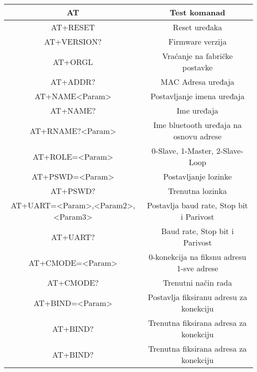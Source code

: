 \documentclass[../Document.tex]{subfiles}
\begin{document}
\begin{table}[h]
    \def\arraystretch{1.5}
    \centering
    \begin{tabular}{ |c|c| }
        \hline
        AT                                & Test komanad                              \\\hline
        AT+RESET                          & Reset uređaka                             \\\hline
        AT+VERSION?                       & Firmware verzija                          \\\hline
        AT+ORGL                           & Vraćanje na fabričke postavke             \\\hline
        AT+ADDR?                          & MAC Adresa uređaja                        \\\hline
        AT+NAME<Param>                    & Postavljanje imena uređaja                \\\hline
        AT+NAME?                          & Ime uređaja                               \\\hline
        AT+RNAME?<Param>                  & Ime bluetooth uređaja na osnovu adrese    \\\hline
        AT+ROLE=<Param>                   & 0-Slave, 1-Master, 2-Slave-Loop           \\\hline
        AT+PSWD=<Param>                   & Postavljanje lozinke                         \\\hline
        AT+PSWD?                   & Trenutna lozinka                          \\\hline
        AT+UART=<Param>,<Param2>,<Param3> & Postavlja baud rate, Stop bit i Parivost  \\\hline
        AT+UART?                          & Baud rate, Stop bit i Parivost            \\\hline
        AT+CMODE=<Param>                  & 0-konekcija na fiksnu adresu 1-sve adrese \\\hline
        AT+CMODE?                         & Trenutni način rada                       \\\hline
        AT+BIND=<Param>                   & Postavlja fiksiranu adresu za konekciju   \\\hline
        AT+BIND?                          & Trenutna fiksirana adresa za konekciju    \\\hline
        AT+BIND?                          & Trenutna fiksirana adresa za konekciju    \\\hline

\end{tabular}
\end{table}
\end{document}
